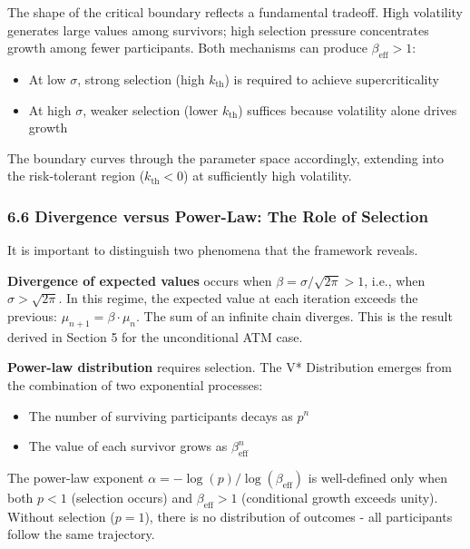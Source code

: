 \documentclass[
  11pt,
  openany]{article}
\providecommand{\tightlist}{%
  \setlength{\itemsep}{0pt}\setlength{\parskip}{0pt}}
\providecommand{\tightlist}{%
  \setlength{\itemsep}{0pt}\setlength{\parskip}{0pt}}
\begin{document}
The shape of the critical boundary reflects a fundamental tradeoff. High
volatility generates large values among survivors; high selection
pressure concentrates growth among fewer participants. Both mechanisms
can produce \(\beta_{\text{eff}} > 1\):

\begin{itemize}
\tightlist
\item
  At low \(\sigma\), strong selection (high \(k_{\text{th}}\)) is
  required to achieve supercriticality
\item
  At high \(\sigma\), weaker selection (lower \(k_{\text{th}}\))
  suffices because volatility alone drives growth
\end{itemize}

The boundary curves through the parameter space accordingly, extending
into the risk-tolerant region (\(k_{\text{th}} < 0\)) at sufficiently
high volatility.

\subsubsection{6.6 Divergence versus Power-Law: The Role of
Selection}\label{divergence-versus-power-law-the-role-of-selection}

It is important to distinguish two phenomena that the framework reveals.

\textbf{Divergence of expected values} occurs when
\(\beta = \sigma/\sqrt{2\pi} > 1\), i.e., when \(\sigma > \sqrt{2\pi}\).
In this regime, the expected value at each iteration exceeds the
previous: \(\mu_{n+1} = \beta \cdot \mu_n\). The sum of an infinite
chain diverges. This is the result derived in Section 5 for the
unconditional ATM case.

\textbf{Power-law distribution} requires selection. The V* Distribution
emerges from the combination of two exponential processes:

\begin{itemize}
\tightlist
\item
  The number of surviving participants decays as \(p^n\)
\item
  The value of each survivor grows as \(\beta_{\text{eff}}^n\)
\end{itemize}

The power-law exponent \(\alpha = -\log(p)/\log(\beta_{\text{eff}})\) is
well-defined only when both \(p < 1\) (selection occurs) and
\(\beta_{\text{eff}} > 1\) (conditional growth exceeds unity). Without
selection (\(p = 1\)), there is no distribution of outcomes - all
participants follow the same trajectory.
\end{document}
